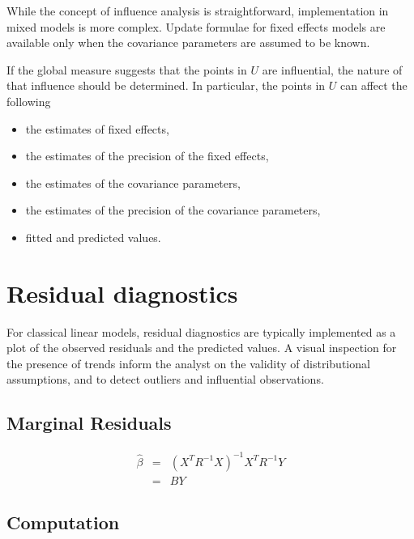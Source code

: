 \documentclass[Main.tex]{subfiles}
\begin{document}

While the concept of influence analysis is straightforward, implementation in mixed models is more complex. Update formulae for fixed effects models are available only when the covariance parameters are assumed to be known.

If the global measure suggests that the points in $U$ are influential, the nature of that influence should be determined. In particular, the points in $U$ can affect the following

\begin{itemize}
	\item the estimates of fixed effects,
	\item the estimates of the precision of the fixed effects,
	\item the estimates of the covariance parameters,
	\item the estimates of the precision of the covariance parameters,
	\item fitted and predicted values.
\end{itemize}


\section{Residual diagnostics} %
For classical linear models, residual diagnostics are typically implemented as a plot of the observed residuals and the predicted values. A visual inspection for the presence of trends inform the analyst on the validity of distributional assumptions, and to detect outliers and influential observations.





	\subsection{Marginal Residuals}
	\begin{eqnarray}
	\hat{\beta} &=& (X^{T}R^{-1}X)^{-1}X^{T}R^{-1}Y \nonumber \\
	&=& BY \nonumber
	\end{eqnarray}



\subsection{Computation}%
\end{document}
